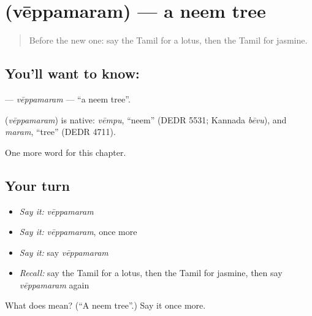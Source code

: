 \section[\texorpdfstring{\ta{வேப்பமரம்} (vēppamaram)}{வேப்பமரம் (vēppamaram)}]{ (vēppamaram) — a neem tree}

\label{lesson:TA-C188-veppamaram}



\begin{quote}
Before the new one: say the Tamil for a lotus, then the Tamil for jasmine.
\end{quote}

\subsection*{You'll want to know: }
\textbf{} — \emph{vēppamaram} — \textquotedblleft{}a neem tree\textquotedblright{}.

\begin{cousinweb}
\textbf{} (\emph{vēppamaram}) is native: \emph{vēmpu}, \textquotedblleft{}neem\textquotedblright{} (DEDR 5531; Kannada \emph{bēvu}), and \emph{maram}, \textquotedblleft{}tree\textquotedblright{} (DEDR 4711).
\end{cousinweb}

\begin{grammarlens}[title={What you've built}]
One more word for this chapter.
\end{grammarlens}

\subsection*{Your turn}
\begin{itemize}
\raggedright
  \item \emph{Say it:} \emph{vēppamaram}
  \item \emph{Say it:} \emph{vēppamaram}, once more
  \item \emph{Say it:} say \emph{vēppamaram}
  \item \emph{Recall:} say the Tamil for a lotus, then the Tamil for jasmine, then say \emph{vēppamaram} again
\end{itemize}

\begin{tcolorbox}[breakable,colback=teal!4,colframe=teal!35!black,title={Before you move on}]
What does  mean? (\textquotedblleft{}A neem tree\textquotedblright{}.) Say it once more.
\end{tcolorbox}
